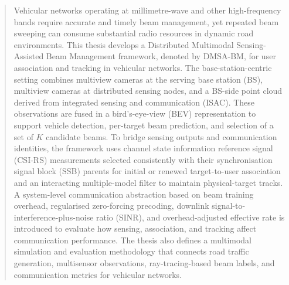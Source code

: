 \begin{abstract}
Vehicular networks operating at millimetre-wave and other high-frequency bands
require accurate and timely beam management, yet repeated beam sweeping can
consume substantial radio resources in dynamic road environments. This thesis
develops a Distributed Multimodal Sensing-Assisted Beam Management framework,
denoted by DMSA-BM, for user association and tracking in vehicular networks.
The base-station-centric setting combines
multiview cameras at the serving base station (BS), multiview cameras at distributed
sensing nodes, and a BS-side point cloud derived from integrated sensing and
communication (ISAC). These observations are fused in a bird's-eye-view (BEV)
representation to support vehicle detection, per-target beam prediction, and
selection of a set of \(K\) candidate beams. To bridge
sensing outputs and communication identities, the framework
uses channel state information reference signal (CSI-RS) measurements selected
consistently with their synchronisation signal block (SSB) parents for initial or renewed
target-to-user association and an interacting multiple-model filter to maintain
physical-target tracks. A system-level communication abstraction based on beam
training overhead, regularised zero-forcing precoding, downlink
signal-to-interference-plus-noise ratio (SINR), and
overhead-adjusted effective rate is introduced to evaluate how
sensing, association, and tracking affect communication performance. The thesis
also defines a multimodal simulation and evaluation methodology that connects
road traffic generation, multisensor observations, ray-tracing-based beam
labels, and communication metrics for vehicular networks.
\end{abstract}
